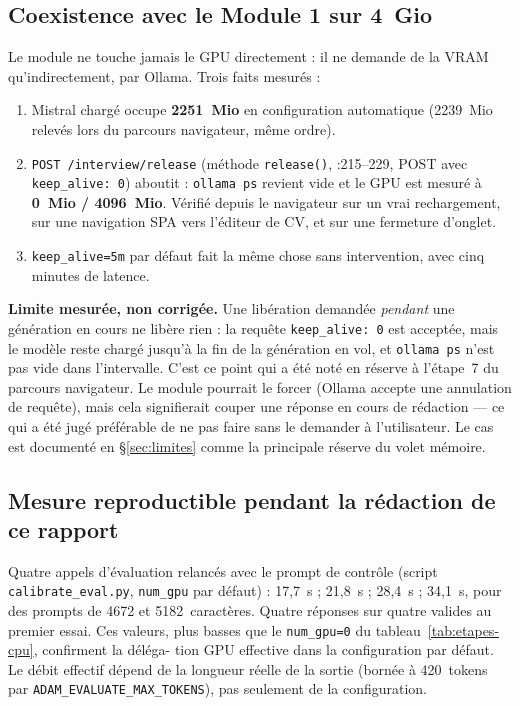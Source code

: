 \subsection{Coexistence avec le Module 1 sur 4~Gio}
\label{sec:perf-vram}

Le module ne touche jamais le GPU directement : il ne demande de la VRAM
qu'indirectement, par Ollama. Trois faits mesurés :

\begin{enumerate}[label=\arabic*.,leftmargin=*,itemsep=2pt]
  \item Mistral chargé occupe \textbf{2251~Mio} en configuration automatique
        (2239~Mio relevés lors du parcours navigateur, même ordre).
  \item \texttt{POST /interview/release} (méthode \texttt{release()},
        :215--229, POST avec \texttt{keep\_alive: 0}) aboutit :
        \texttt{ollama ps} revient vide et le GPU est mesuré à
        \textbf{0~Mio / 4096~Mio}. Vérifié depuis le navigateur sur un vrai
        rechargement, sur une navigation SPA vers l'éditeur de CV, et sur une
        fermeture d'onglet.
  \item \texttt{keep\_alive=5m} par défaut fait la même chose sans intervention,
        avec cinq minutes de latence.
\end{enumerate}

\textbf{Limite mesurée, non corrigée.} Une libération demandée
\emph{pendant} une génération en cours ne libère rien : la requête
\texttt{keep\_alive: 0} est acceptée, mais le modèle reste chargé jusqu'à la fin
de la génération en vol, et \texttt{ollama ps} n'est pas vide dans l'intervalle.
C'est ce point qui a été noté en réserve à l'étape~7 du parcours navigateur.
Le module pourrait le forcer (Ollama accepte une annulation de requête), mais
cela signifierait couper une réponse en cours de rédaction --- ce qui a été
jugé préférable de ne pas faire sans le demander à l'utilisateur. Le cas est
documenté en §\ref{sec:limites} comme la principale réserve du volet mémoire.

\subsection{Mesure reproductible pendant la rédaction de ce rapport}
\label{sec:perf-controle}

Quatre appels d'évaluation relancés avec le prompt de contrôle (script
\texttt{calibrate\_eval.py}, \texttt{num\_gpu} par défaut) : 17,7~s ; 21,8~s ;
28,4~s ; 34,1~s, pour des prompts de 4672 et 5182~caractères. Quatre réponses
sur quatre valides au premier essai. Ces valeurs, plus basses que le
\texttt{num\_gpu=0} du tableau~\ref{tab:etapes-cpu}, confirment la déléga-
tion GPU effective dans la configuration par défaut. Le débit effectif dépend
de la longueur réelle de la sortie (bornée à 420~tokens par
\texttt{ADAM\_EVALUATE\_MAX\_TOKENS}), pas seulement de la configuration.

